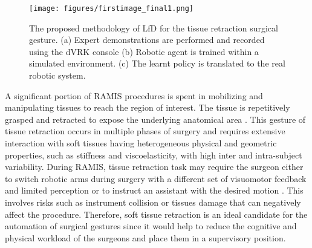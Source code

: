 \documentclass[letterpaper, 10 pt, conference]{ieeeconf}
\begin{document}
\begin{figure}[t]
	\centering
	\texttt{[image: figures/firstimage\_final1.png]}
	\caption{The proposed methodology of LfD for the tissue retraction surgical gesture. (a) Expert demonstrations are performed and recorded using the dVRK console %
	(b) Robotic agent is trained within a simulated environment. (c) The learnt policy is translated to the real robotic system.}
	\label{fig:setup}
\end{figure}

A significant portion of RAMIS procedures is spent in mobilizing and manipulating tissues to reach the region of interest.
The tissue is repetitively grasped and retracted to expose the underlying anatomical area \cite{patil2010toward}. This gesture of tissue retraction occurs in multiple phases of surgery and
requires extensive interaction with soft tissues having heterogeneous physical and geometric properties, such as stiffness and viscoelasticity, with high inter and intra-subject variability. During RAMIS, tissue retraction task may require the surgeon either to switch robotic arms during surgery with a different set of visuomotor feedback and limited perception or to instruct an assistant with the desired motion \cite{attanasio2020autonomous}. This involves risks such as instrument collision or tissues damage that can negatively affect the procedure. Therefore, soft tissue retraction is an ideal candidate for the automation of surgical gestures since it would help to reduce the cognitive and physical workload of the surgeons and place them in a supervisory position.

\end{document}
